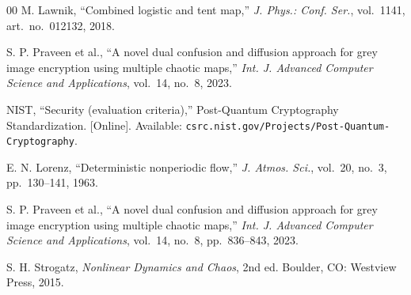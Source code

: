 \documentclass[conference]{IEEEtran}
\begin{document}
\begin{thebibliography}{00}
	M. Lawnik, ``Combined logistic and tent map,'' \textit{J. Phys.: Conf. Ser.}, vol.~1141, art.~no.~012132, 2018.

	S. P. Praveen et al., ``A novel dual confusion and diffusion approach for grey image encryption using multiple chaotic maps,'' \textit{Int. J. Advanced Computer Science and Applications}, vol.~14, no.~8, 2023.

	NIST, ``Security (evaluation criteria),'' Post-Quantum Cryptography Standardization. [Online]. Available: \texttt{csrc.nist.gov/Projects/Post-Quantum-Cryptography}.

	E. N. Lorenz, ``Deterministic nonperiodic flow,'' \textit{J. Atmos. Sci.}, vol.~20, no.~3, pp.~130--141, 1963.

	S. P. Praveen et al., ``A novel dual confusion and diffusion approach for grey image encryption using multiple chaotic maps,'' \textit{Int. J. Advanced Computer Science and Applications}, vol.~14, no.~8, pp.~836--843, 2023.

	S. H. Strogatz, \textit{Nonlinear Dynamics and Chaos}, 2nd ed. Boulder, CO: Westview Press, 2015.

\end{thebibliography}
\end{document}
